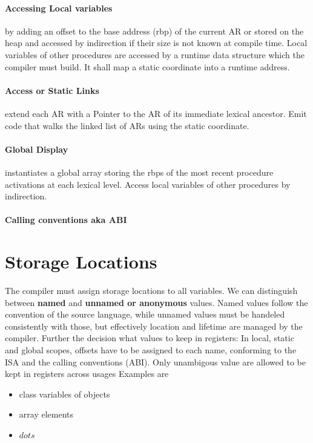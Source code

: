 \paragraph{Accessing Local variables} by adding an offset to the base address (rbp) of the current AR or stored on the heap and accessed by indirection if their size is not known at compile time. Local variables of other procedures are accessed by a runtime data structure which the compiler must build. It shall map a static coordinate into a runtime address. \\

\paragraph{Access or Static Links} extend each AR with a Pointer to the AR of its immediate lexical ancestor. Emit code that walks the linked list of ARs using the static coordinate.

\paragraph{Global Display} instantiates a global array storing the rbps of the most recent procedure activations at each lexical level. Access local variables of other procedures by indirection.

\paragraph{Calling conventions aka ABI}

\section{Storage Locations}
The compiler must assign storage locations to all variables. We can distinguish between \textbf{named} and \textbf{unnamed or anonymous} values. Named values follow the convention of the source language, while unnamed values must be handeled consistently with those, but effectively location and lifetime are managed by the compiler. Further the decision what values to keep in registers:
In local, static and global scopes, offsets have to be assigned to each name, conforming to the ISA and the calling conventions (ABI).
Only unambigous value are allowed to be kept in registers across usages
Examples are
\begin{itemize}
	\item class variables of objects
	\item array elements
	\item $dots$
\end{itemize}


